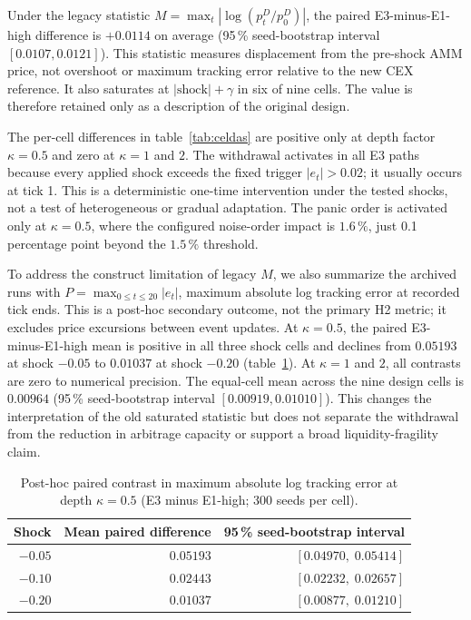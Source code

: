 Under the legacy statistic $M=\max_t|\log(p_t^D/p_0^D)|$, the paired E3-minus-E1-high difference is $+0.0114$ on average (95\,\% seed-bootstrap interval $[0.0107,0.0121]$). This statistic measures displacement from the pre-shock AMM price, not overshoot or maximum tracking error relative to the new CEX reference. It also saturates at $|\text{shock}|+\gamma$ in six of nine cells. The value is therefore retained only as a description of the original design.

The per-cell differences in table~\ref{tab:celdas} are positive only at depth factor $\kappa=0.5$ and zero at $\kappa=1$ and $2$. The withdrawal activates in all E3 paths because every applied shock exceeds the fixed trigger $|e_t|>0.02$; it usually occurs at tick 1. This is a deterministic one-time intervention under the tested shocks, not a test of heterogeneous or gradual adaptation. The panic order is activated only at $\kappa=0.5$, where the configured noise-order impact is $1.6\,\%$, just 0.1 percentage point beyond the $1.5\,\%$ threshold.

To address the construct limitation of legacy $M$, we also summarize the archived runs with $P=\max_{0\le t\le20}|e_t|$, maximum absolute log tracking error at recorded tick ends. This is a post-hoc secondary outcome, not the primary H2 metric; it excludes price excursions between event updates. At $\kappa=0.5$, the paired E3-minus-E1-high mean is positive in all three shock cells and declines from $0.05193$ at shock $-0.05$ to $0.01037$ at shock $-0.20$ (table~\ref{tab:h2-peak-error}). At $\kappa=1$ and $2$, all contrasts are zero to numerical precision. The equal-cell mean across the nine design cells is $0.00964$ (95\,\% seed-bootstrap interval $[0.00919,0.01010]$). This changes the interpretation of the old saturated statistic but does not separate the withdrawal from the reduction in arbitrage capacity or support a broad liquidity-fragility claim.

\begin{table}[htbp]
\centering
\caption{Post-hoc paired contrast in maximum absolute log tracking error at depth $\kappa=0.5$ (E3 minus E1-high; 300 seeds per cell).}
\label{tab:h2-peak-error}
\small
\begin{tabular}{@{}rrr@{}}
\toprule
Shock & Mean paired difference & 95\,\% seed-bootstrap interval \\
\midrule
$-0.05$ & $0.05193$ & $[0.04970,\;0.05414]$ \\
$-0.10$ & $0.02443$ & $[0.02232,\;0.02657]$ \\
$-0.20$ & $0.01037$ & $[0.00877,\;0.01210]$ \\
\bottomrule
\end{tabular}
\end{table}

